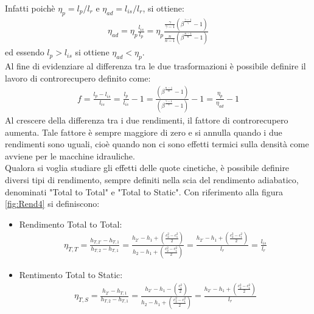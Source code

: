 Infatti poichè $\eta_p = l_p / l_r$ e $\eta_{ad} = l_{is} / l_r$, si ottiene:
\begin{align*}
\eta_{ad} = \eta_p \frac{l_{is}}{l_p} = \eta_p \frac{\frac{\gamma}{\gamma-1} \left(\beta^{\frac{\gamma -1}{\gamma}}-1 \right)}{\frac{n}{n-1} \left(\beta^{\frac{n -1}{n}}-1 \right)}
\end{align*}
ed essendo $l_p > l_{is}$ si ottiene $\eta_{ad} < \eta_p$.\\
Al fine di evidenziare al differenza tra le due trasformazioni è possibile definire il lavoro di controrecupero definito come:
\begin{align*}
f = \frac{l_p - l_{is}}{l_{is}} = \frac{l_p}{l_{is}} -1 = \frac{\left( \beta^{\frac{n-1}{n}} -1 \right)}{\left( \beta^{\frac{\gamma-1}{\gamma}} -1 \right)} -1 = \frac{\eta_p}{\eta_{ad}} -1
\end{align*}
Al crescere della differenza tra i due rendimenti, il fattore di controrecupero aumenta. Tale fattore è sempre maggiore di zero e si annulla quando i due rendimenti sono uguali, cioè quando non ci sono effetti termici sulla densità come avviene per le macchine idrauliche.\\
Qualora si voglia studiare gli effetti delle quote cinetiche, è possibile definire diversi tipi di rendimento, sempre definiti nella scia del rendimento adiabatico, denominati "Total to Total" e "Total to Static". Con riferimento alla figura \ref{fig:Rend4} si definiscono:
\begin{itemize}
\item Rendimento Total to Total:
\begin{align*}
\eta_{T,T} = \frac{h_{T,2'} - h_{T,1}}{h_{T,2} - h_{T,1}} = \frac{h_{2'} - h_1 + \left( \frac{c_2^2 - c_1^2}{2} \right)}{h_2 - h_1 + \left( \frac{c_2^2 - c_1^2}{2} \right)} = \frac{h_{2'} - h_1 + \left( \frac{c_2^2 - c_1^2}{2} \right)}{l_r} = \frac{l_{is}}{l_r}
\end{align*}
\item Rentimento Total to Static:
\begin{align*}
\eta_{T,S} = \frac{h_{2'} - h_{T,1}}{h_{T,2} - h_{T,1}} = \frac{h_{2'} - h_1 - \left( \frac{ c_1^2}{2} \right)}{h_2 - h_1 + \left( \frac{c_2^2 - c_1^2}{2} \right)} = \frac{h_{2'} - h_1 + \left( \frac{c_2^2 - c_1^2}{2} \right)}{l_r}
\end{align*}
\end{itemize}
\pagebreak
